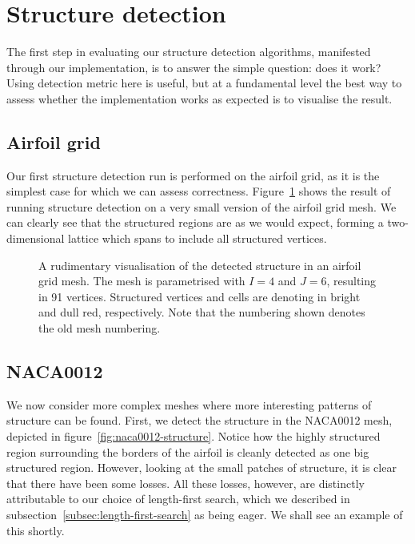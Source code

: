 \section{Structure detection}
The first step in evaluating our structure detection algorithms, manifested through our implementation, is to answer the simple question: does it work? Using detection metric here is useful, but at a fundamental level the best way to assess whether the implementation works as expected is to visualise the result.


\subsection{Airfoil grid}
Our first structure detection run is performed on the airfoil grid, as it is the simplest case for which we can assess correctness. Figure~\ref{fig:airfoil-grid-visual} shows the result of running structure detection on a very small version of the airfoil grid mesh. We can clearly see that the structured regions are as we would expect, forming a two-dimensional lattice which spans to include all structured vertices.

\begin{figure}

\caption[Visualisation of detected structure in the airfoil grid mesh]{A rudimentary visualisation\footnotemark{} of the detected structure in an airfoil grid mesh. The mesh is parametrised with $I=4$ and $J=6$, resulting in 91 vertices. Structured vertices and cells are denoting in bright and dull red, respectively. Note that the numbering shown denotes the old mesh numbering.}
\label{fig:airfoil-grid-visual}
\end{figure}\nopagebreak{}



\subsection{NACA0012}
We now consider more complex meshes where more interesting patterns of structure can be found. First, we detect the structure in the NACA0012 mesh, depicted in figure~\ref{fig:naca0012-structure}. Notice how the highly structured region surrounding the borders of the airfoil is cleanly detected as one big structured region. However, looking at the small patches of structure, it is clear that there have been some losses. All these losses, however, are distinctly attributable to our choice of length-first search, which we described in subsection~\ref{subsec:length-first-search} as being eager. We shall see an example of this shortly.

